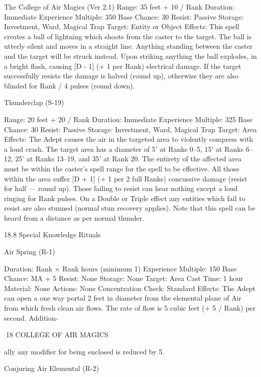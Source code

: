 \begin{Chapter}{The College of Air Magics (Ver 2.1)}
Range: 35 feet + 10 / Rank 
Duration: Immediate 
Experience Multiple: 350 
Base Chance: 30%
Resist: Passive 
Storage: Investment, Ward, Magical Trap 
Target: Entity or Object 
Effects: This spell creates a ball of lightning which 
shoots  from  the  caster  to  the  target.  The  ball  is 
utterly silent and moves in a straight line. Anything 
standing  between  the  caster  and  the  target  will  be 
struck  instead.  Upon  striking  anything  the  ball 
explodes, in a bright flash, causing [D - 1] (+ 1 per 
Rank)  electrical  damage.  If  the  target  successfully 
resists  the  damage  is halved  (round up),  otherwise 
they  are  also  blinded  for  Rank  /  4  pulses  (round 
down). 

Thunderclap (S-19) 

Range: 20 feet + 20 / Rank 
Duration: Immediate 
Experience Multiple: 325 
Base Chance: 30%
Resist: Passive 
Storage: Investment, Ward, Magical Trap 
Target: Area 
Effects:  The  Adept  causes  the  air  in  the  targeted 
area  to  violently  compress  with  a  loud  crash.  The 
target area has a diameter of 5’ at Ranks 0–5, 15’ at 
Ranks 6–12, 25’ at Ranks 13–19, and 35’ at Rank 
20. The entirety of the affected area must be within 
the caster’s spell range for the spell to be effective. 
All those within the area suffer [D + 1] (+ 1 per 2 
full  Ranks)  concussive  damage  (resist  for  half  — 
round up). Those failing to resist can hear nothing 
except a loud ringing for Rank pulses. On a Double 
or Triple effect any entities which fail to resist are 
also  stunned  (normal  stun  recovery  applies).  Note 
that  this  spell  can  be  heard  from a  distance  as  per 
normal thunder. 

18.8 Special Knowledge Rituals 

Air Spring (R-1) 

Duration: Rank × Rank hours (minimum 1) 
Experience Multiple: 150 
Base Chance: MA + 5%
Resist: None 
Storage: None 
Target: Area 
Cast Time: 1 hour 
Material: None 
Actions: None 
Concentration Check: Standard 
Effects:  The  Adept  can  open  a  one  way  portal  2 
feet  in  diameter  from  the  elemental  plane  of  Air 
from which fresh clean air flows. The rate of flow 
is  5  cubic  feet  (+  5  /  Rank)  per  second.  Addition-

18 COLLEGE OF AIR MAGICS 

ally any modifier for being enclosed is reduced by 
5. 

Conjuring Air Elemental (R-2) 


\end{Chapter}
